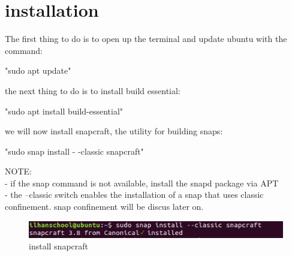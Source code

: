 \documentclass{article}
\begin{document}
\section{installation}\label{sec:installation}	%
The first thing to do is to open up the terminal and update ubuntu with the command:\\
\begin{flushleft}	
	\begin{center}	
	"sudo apt update"\\ 
	\end{center}
	
\begin{flushleft}	
the next thing to do is to install build essential:\\ 
\end{flushleft}		

 	\begin{center}	
	"sudo apt install build-essential"\\
	\end{center}

\begin{flushleft}	
we will now install snapcraft, the utility for building snaps:\\
\end{flushleft}		
	
	\begin{center}	
	"sudo snap install   - -classic snapcraft"\\ 
	\end{center}

\begin{flushleft}		
NOTE:\\
- if the snap command is not available, install the snapd%
 package via APT\\
 
- the --classic switch enables the installation of a snap that uses classic confinement. snap confinement will be discus later on.
\label{fig:step1}
	\begin{figure}[H]
	\includegraphics[width=5in]{step1.png}

	\caption[Optional caption]{install snapcraft}
	\end{figure}
\end{flushleft}		
\cleardoublepage
%
%
%
%
%

\end{flushleft}
\end{document}
